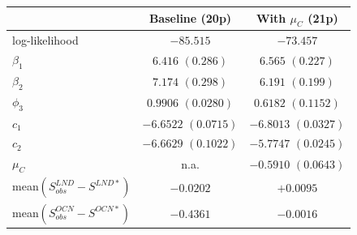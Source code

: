   \begin{tabular}{lcc}
    \hline
     & Baseline (20p) & With $\mu_C$ (21p) \\
    \hline
    log-likelihood & $-85.515$ & $-73.457$ \\
    $\beta_1$ & $6.416$ $(0.286)$ & $6.565$ $(0.227)$ \\
    $\beta_2$ & $7.174$ $(0.298)$ & $6.191$ $(0.199)$ \\
    $\phi_3$ & $0.9906$ $(0.0280)$ & $0.6182$ $(0.1152)$ \\
    $c_1$ & $-6.6522$ $(0.0715)$ & $-6.8013$ $(0.0327)$ \\
    $c_2$ & $-6.6629$ $(0.1022)$ & $-5.7747$ $(0.0245)$ \\
    $\mu_C$ & n.a. & $-0.5910$ $(0.0643)$ \\
    mean$(S^{LND}_{obs} - S^{LND*})$ & $-0.0202$ & $+0.0095$ \\
    mean$(S^{OCN}_{obs} - S^{OCN*})$ & $-0.4361$ & $-0.0016$ \\
    \hline
  \end{tabular}

